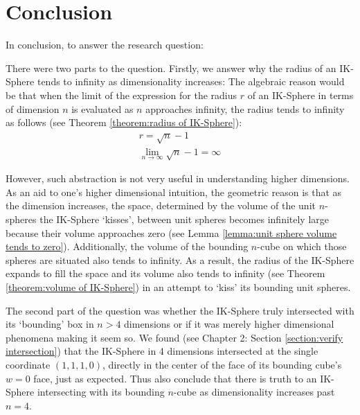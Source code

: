 \section{Conclusion}
In conclusion, to answer the research question:
\researchquestion{}

There were two parts to the question. Firstly, we answer why the radius of an IK-Sphere tends to infinity as dimensionality increases:
The algebraic reason would be that when the limit of the expression for the radius $r$ of an IK-Sphere in terms of dimension $n$ is evaluated as $n$ approaches infinity, the radius tends to infinity as follows (see Theorem \ref{theorem:radius of IK-Sphere}):
\begin{align*}
    r = \sqrt{n}-1\\
    \lim_{n \to \infty}\sqrt{n}-1 = \infty
\end{align*}

However, such abstraction is not very useful in understanding higher dimensions. As an aid to one's higher dimensional intuition, the geometric reason is that as the dimension increases, the space, determined by the volume of the unit $n$-spheres the IK-Sphere `kisses', between unit spheres becomes infinitely large because their volume approaches zero (see Lemma \ref{lemma:unit sphere volume tends to zero}). Additionally, the volume of the bounding $n$-cube on which those spheres are situated also tends to infinity. As a result, the radius of the IK-Sphere expands to fill the space and its volume also tends to infinity (see Theorem \ref{theorem:volume of IK-Sphere}) in an attempt to `kiss' its bounding unit spheres. 

The second part of the question was whether the IK-Sphere truly intersected with its `bounding' box in $n>4$ dimensions or if it was merely higher dimensional phenomena making it seem so. We found (see Chapter 2: Section \ref{section:verify intersection}) that the IK-Sphere in 4 dimensions intersected at the single coordinate $(1, 1, 1, 0)$, directly in the center of the face of its bounding cube's $w=0$ face, just as expected. Thus also conclude that there is truth to an IK-Sphere intersecting with its bounding $n$-cube as dimensionality increases past $n=4$.

